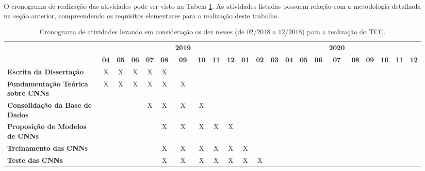 
O cronograma de realização das atividades pode ser visto na Tabela \ref{tab:cronograma}. As atividades listadas possuem relação com a metodologia detalhada na seção anterior, compreendendo os requisitos elementares para a realização deste trabalho.\newline

\begin{table}[!ht]
\caption{Cronograma de atividades levando em consideração os dez meses (de $02/2018$ a $12/2018$) para a realização do TCC.}
\label{tab:cronograma}
\begin{adjustbox}{width=1\textwidth}
\begin{tabular}{p{5cm}ccccccccccccccccccccc}
  \toprule
  & &  &  & &  & \textbf{2019}  & &  &  &  &  &  &  & &  & \textbf{2020} &  &  &  &  & \\
                                        & \textbf{04} & \textbf{05} & \textbf{06} & \textbf{07} & \textbf{08} & \textbf{09} & \textbf{10} & \textbf{11} & \textbf{12} & \textbf{01} & \textbf{02} & \textbf{03} & \textbf{04} & \textbf{05} & \textbf{06} & \textbf{07} & \textbf{08} & \textbf{09} & \textbf{10} & \textbf{11} & \textbf{12} \\
  \midrule
  \textbf{Escrita da Dissertação}          &      X      &      X      &      X      &      X      &      X      &             &             &             &             &             &             \\
  \textbf{Fundamentação Teórica sobre
  CNNs}          &      X      &      X      &      X      &      X      &      X      &      X      &             &             &             &             &             \\
  \textbf{Consolidação da Base de Dados}&     &   &     &      X      &      X      &     X      &     X      &             &             &             &             &             &             \\
  \textbf{Proposição de Modelos de
  CNNs}         &             &             &             &      &            X      &      X      &      X      &      X      &      X      &             &             &             \\
  \textbf{Treinamento das
  CNNs}         &             &             &             &             &      X      &      X      &      X      &      X      &      X      &      X       &            \\
  \textbf{Teste das CNNs}               &             &             &             &             &      X      &      X      &      X      &      X      &      X      &      X       &     X      \\

\end{tabular}
\end{adjustbox}
\end{table}
